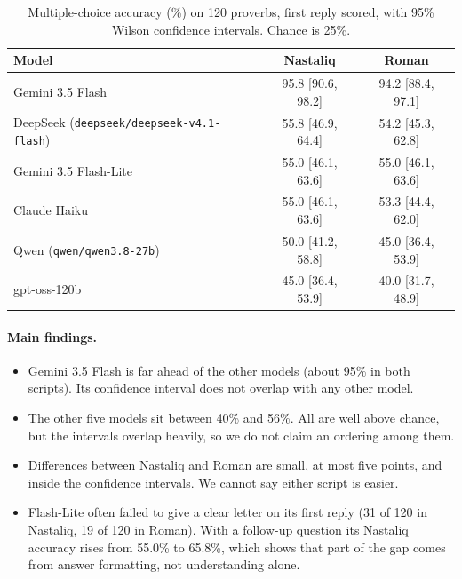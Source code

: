 \documentclass[11pt]{article}
\begin{document}
\begin{table}[t]
\centering
\caption{Multiple-choice accuracy (\%) on 120 proverbs, first reply scored, with 95\% Wilson confidence intervals. Chance is 25\%.}
\label{tab:main}
\small
\begin{tabular}{lcc}
\toprule
Model & Nastaliq & Roman \\
\midrule
Gemini 3.5 Flash & 95.8 [90.6, 98.2] & 94.2 [88.4, 97.1] \\
DeepSeek (\texttt{deepseek/deepseek-v4.1-flash}) & 55.8 [46.9, 64.4] & 54.2 [45.3, 62.8] \\
Gemini 3.5 Flash-Lite & 55.0 [46.1, 63.6] & 55.0 [46.1, 63.6] \\
Claude Haiku & 55.0 [46.1, 63.6] & 53.3 [44.4, 62.0] \\
Qwen (\texttt{qwen/qwen3.8-27b}) & 50.0 [41.2, 58.8] & 45.0 [36.4, 53.9] \\
gpt-oss-120b & 45.0 [36.4, 53.9] & 40.0 [31.7, 48.9] \\
\bottomrule
\end{tabular}
\end{table}


\paragraph{Main findings.}
\begin{itemize}
\item Gemini 3.5 Flash is far ahead of the other models (about 95\% in both scripts). Its confidence interval does not overlap with any other model.
\item The other five models sit between 40\% and 56\%. All are well above chance, but the intervals overlap heavily, so we do not claim an ordering among them.
\item Differences between Nastaliq and Roman are small, at most five points, and inside the confidence intervals. We cannot say either script is easier.
\item Flash-Lite often failed to give a clear letter on its first reply (31 of 120 in Nastaliq, 19 of 120 in Roman). With a follow-up question its Nastaliq accuracy rises from 55.0\% to 65.8\%, which shows that part of the gap comes from answer formatting, not understanding alone.
\end{itemize}
\end{document}
